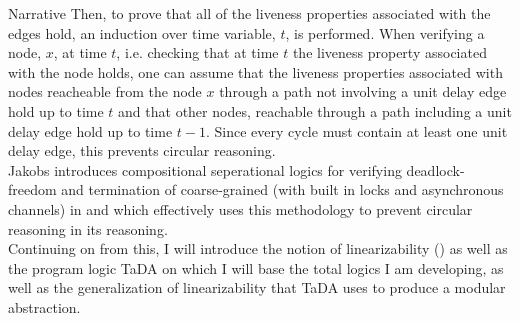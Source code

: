 \documentclass{article}
\begin{document}
\begin{section}{Narrative}
  Then, to prove that all of the liveness properties associated with the edges hold, an induction over time variable, $t$, is performed. When verifying a node, $x$, at time $t$, i.e. checking that at time $t$ the liveness property associated with the node holds, one can assume that the liveness properties associated with nodes reacheable from the node $x$ through a path not involving a unit delay edge hold up to time $t$ and that other nodes, reachable through a path including a unit delay edge hold up to time $t - 1$. Since every cycle must contain at least one unit delay edge, this prevents circular reasoning. \\

  Jakobs introduces compositional seperational logics for verifying deadlock-freedom and termination of coarse-grained (with built in locks and asynchronous channels) in \cite{} and \cite{} which effectively uses this methodology to prevent circular reasoning in its reasoning. \\

  Continuing on from this, I will introduce the notion of linearizability (\cite{Linearizability}) as well as the program logic TaDA on which I will base the total logics I am developing, as well as the generalization of linearizability that TaDA uses to produce a modular abstraction. 
  
\end{section}


 
\end{document}
